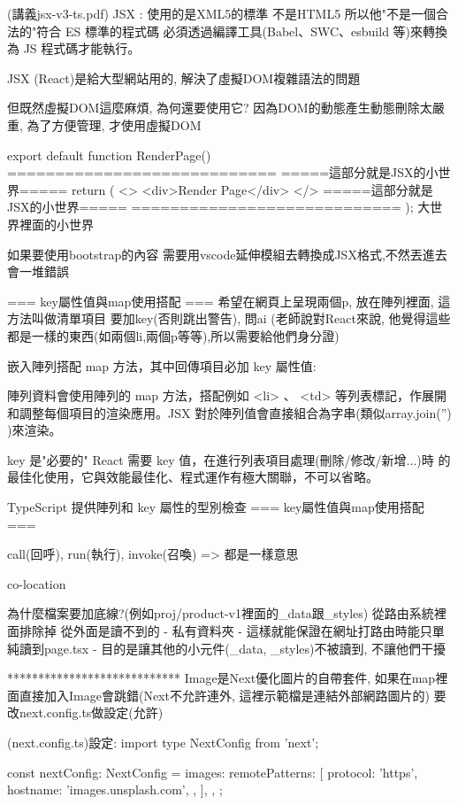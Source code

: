 (講義jsx-v3-ts.pdf)
JSX :
使用的是XML5的標準
不是HTML5
所以他"不是一個合法的"符合 ES 標準的程式碼
必須透過編譯工具(Babel、SWC、esbuild 等)來轉換為 JS 程式碼才能執行。

JSX (React)是給大型網站用的,
解決了虛擬DOM複雜語法的問題

但既然虛擬DOM這麼麻煩, 為何還要使用它?
因為DOM的動態產生動態刪除太嚴重, 為了方便管理, 才使用虛擬DOM

export default function RenderPage() {
  ============================
  =====這部分就是JSX的小世界=====
  return (
    <>
      <div>Render Page</div>
    </>
  =====這部分就是JSX的小世界=====
  ============================
  );
}
大世界裡面的小世界

如果要使用bootstrap的內容
需要用vscode延伸模組去轉換成JSX格式,不然丟進去會一堆錯誤

=== key屬性值與map使用搭配 ===
希望在網頁上呈現兩個p, 放在陣列裡面, 這方法叫做清單項目
要加key(否則跳出警告), 問ai
(老師說對React來說, 他覺得這些都是一樣的東西(如兩個li,兩個p等等),所以需要給他們身分證)

嵌入陣列搭配 map ⽅法，其中回傳項目必加 key 屬性值:

陣列資料會使用陣列的 map 方法，搭配例如 <li> 、 <td> 等列表標記，作展開
和調整每個項目的渲染應用。JSX 對於陣列值會直接組合為字串(類似array.join('') )來渲染。

key 是"必要的" React 需要 key 值，在進行列表項目處理(刪除/修改/新增...)時
的最佳化使用，它與效能最佳化、程式運作有極大關聯，不可以省略。

TypeScript 提供陣列和 key 屬性的型別檢查
=== key屬性值與map使用搭配 ===

call(回呼), run(執行), invoke(召喚) => 都是一樣意思

co-location

為什麼檔案要加底線?(例如proj/product-v1裡面的_data跟_styles)
從路由系統裡面排除掉
從外面是讀不到的
- 私有資料夾
- 這樣就能保證在網址打路由時能只單純讀到page.tsx
- 目的是讓其他的小元件(_data, _styles)不被讀到, 不讓他們干擾  

****************************
Image是Next優化圖片的自帶套件,
如果在map裡面直接加入Image會跳錯(Next不允許連外, 這裡示範檔是連結外部網路圖片的)
要改next.config.ts做設定(允許)

(next.config.ts)設定:
import type { NextConfig } from 'next';

const nextConfig: NextConfig = {
  images: {
    remotePatterns: [
      {
        protocol: 'https',
        hostname: 'images.unsplash.com',
      },
    ],
  },
};

